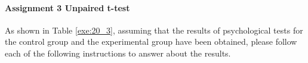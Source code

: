 \documentclass{ltjsbook}
\begin{document}
\paragraph{Assignment 3 Unpaired t-test}
As shown in Table \ref{exe:20_3}, assuming that the results of psychological tests for the control group and the experimental group have been obtained, please follow each of the following instructions to answer about the results.



\end{document}
